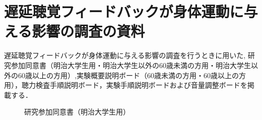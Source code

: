 \chapter{遅延聴覚フィードバックが身体運動に与える影響の調査の資料}
遅延聴覚フィードバックが身体運動に与える影響の調査を行うときに用いた,
研究参加同意書（明治大学生用・明治大学生以外の60歳未満の方用・明治大学生以外の60歳以上の方用）,実験概要説明ボード（60歳未満の方用・60歳以上の方用），聴力検査手順説明ボード，実験手順説明ボードおよび音量調整ボードを掲載する．
\begin{figure}[ht]
	\centering
  \setlength{\fboxsep}{1pt} %
  \setlength{\fboxrule}{1pt} %
	\caption{研究参加同意書（明治大学生用）}
\end{figure}

